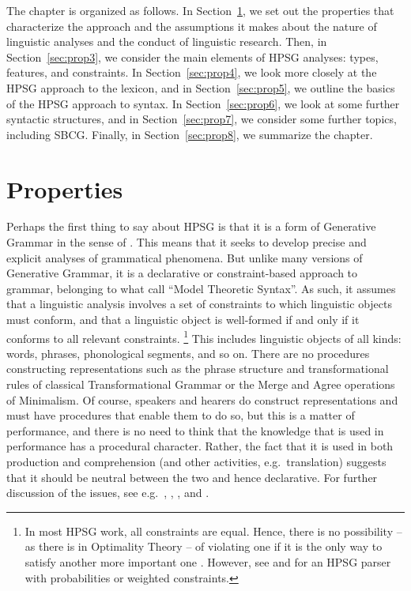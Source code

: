 \documentclass[output=paper
	        ,collection
	        ,collectionchapter
 	        ,biblatex
                ,babelshorthands
                ,newtxmath
                ,draftmode
                ,colorlinks, citecolor=brown
]{langscibook}
\begin{document}
The chapter is organized as follows. In Section~\ref{sec:prop2}, we set out the properties that
characterize the approach and the assumptions it makes about the nature of linguistic analyses and
the conduct of linguistic research. Then, in Section~\ref{sec:prop3}, we consider the main elements
of HPSG analyses: types, features, and constraints. In Section~\ref{sec:prop4}, we look more closely
at the HPSG approach to the lexicon, and in Section~\ref{sec:prop5}, we outline the basics of the
HPSG approach to syntax. In Section~\ref{sec:prop6}, we look at some further syntactic structures,
and in Section~\ref{sec:prop7}, we consider some further topics, including SBCG. Finally, in
Section~\ref{sec:prop8}, we summarize the chapter. 


\section{Properties}\label{sec:prop2}
\label{prop:sec-properties}

Perhaps the first thing to say about HPSG is that it is a form of Generative Grammar in the sense of
\citet[]{Chomsky65a}. This means that it seeks to develop precise and explicit analyses of
grammatical phenomena. But unlike many versions of Generative Grammar, it is a declarative or
constraint-based approach to grammar, belonging to what \citet{PS2001a} call ``Model Theoretic
Syntax''. As such, it assumes that a linguistic analysis involves a set of constraints to which
linguistic objects must conform, and that a linguistic object is well-formed if and only if it
conforms to all relevant constraints.%
%
\footnote{In most HPSG work, all constraints are equal. Hence, there is no possibility -- as there is in Optimality Theory -- of violating one if it is the only way to satisfy another more important one \citep{Malouf2003a}. However, see  and  for an HPSG parser with probabilities or weighted constraints.}
%
This includes linguistic objects of all kinds: words, phrases, phonological segments, and so on. There are no procedures constructing representations such as the phrase structure and transformational rules of classical Transformational Grammar or the Merge and Agree operations of Minimalism. Of course, speakers and hearers do construct representations and must have procedures that enable them to do so, but this is a matter of performance, and there is no need to think that the knowledge that is used in performance has a procedural character. Rather, the fact that it is used in both production and comprehension (and other activities, e.g.\ translation) suggests that it should be neutral between the two and hence declarative. For further discussion of the issues, see e.g.\ \citet{PS2001a}, \citet{Postal2003a}, \citet{SW2011a,SW2015a}, and .
\end{document}
